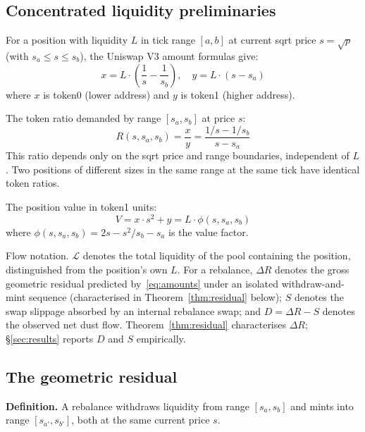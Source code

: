 \documentclass[11pt,a4paper]{article}
\begin{document}
\subsection{Concentrated liquidity preliminaries}\label{sec:preliminaries}

For a position with liquidity $L$ in tick range $[a, b]$ at current sqrt price $s = \sqrt{p}$ (with $s_a \leq s \leq s_b$), the Uniswap V3 amount formulas give:
\begin{equation}\label{eq:amounts}
x = L \cdot \left(\frac{1}{s} - \frac{1}{s_b}\right), \quad y = L \cdot (s - s_a)
\end{equation}
where $x$ is token0 (lower address) and $y$ is token1 (higher address).

The token ratio demanded by range $[s_a, s_b]$ at price $s$:
\begin{equation}\label{eq:ratio}
R(s, s_a, s_b) = \frac{x}{y} = \frac{1/s - 1/s_b}{s - s_a}
\end{equation}
This ratio depends only on the sqrt price and range boundaries, independent of $L$. Two positions of different sizes in the same range at the same tick have identical token ratios.

The position value in token1 units:
\begin{equation}\label{eq:value}
V = x \cdot s^2 + y = L \cdot \phi(s, s_a, s_b)
\end{equation}
where $\phi(s, s_a, s_b) = 2s - s^2/s_b - s_a$ is the value factor.

Flow notation. $\mathcal{L}$ denotes the total liquidity of the pool containing the position, distinguished from the position's own $L$. For a rebalance, $\Delta R$ denotes the gross geometric residual predicted by~\eqref{eq:amounts} under an isolated withdraw-and-mint sequence (characterised in Theorem~\ref{thm:residual} below); $S$ denotes the swap slippage absorbed by an internal rebalance swap; and $D = \Delta R - S$ denotes the observed net dust flow. Theorem~\ref{thm:residual} characterises $\Delta R$; \S\ref{sec:results} reports $D$ and $S$ empirically.

\subsection{The geometric residual}\label{sec:residual}

\textbf{Definition.} A rebalance withdraws liquidity from range $[s_a, s_b]$ and mints into range $[s_{a'}, s_{b'}]$, both at the same current price $s$.
\end{document}
